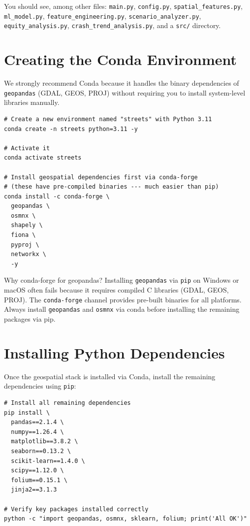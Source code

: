 \documentclass[11pt,a4paper,openany]{book}
\begin{document}
You should see, among other files: \texttt{main.py}, \texttt{config.py}, \texttt{spatial\_features.py}, \texttt{ml\_model.py}, \texttt{feature\_engineering.py}, \texttt{scenario\_analyzer.py}, \texttt{equity\_analysis.py}, \texttt{crash\_trend\_analysis.py}, and a \texttt{src/} directory.

\section{Creating the Conda Environment}

We strongly recommend Conda because it handles the binary dependencies of \texttt{geopandas} (GDAL, GEOS, PROJ) without requiring you to install system-level libraries manually.

\begin{lstlisting}[style=bash, caption={Create and activate the Conda environment}]
# Create a new environment named "streets" with Python 3.11
conda create -n streets python=3.11 -y

# Activate it
conda activate streets

# Install geospatial dependencies first via conda-forge
# (these have pre-compiled binaries --- much easier than pip)
conda install -c conda-forge \
  geopandas \
  osmnx \
  shapely \
  fiona \
  pyproj \
  networkx \
  -y
\end{lstlisting}

\begin{warnbox}{Why conda-forge for geopandas?}
Installing \texttt{geopandas} via \texttt{pip} on Windows or macOS often fails because it requires compiled C libraries (GDAL, GEOS, PROJ). The \texttt{conda-forge} channel provides pre-built binaries for all platforms. Always install \texttt{geopandas} and \texttt{osmnx} via conda before installing the remaining packages via pip.
\end{warnbox}

\section{Installing Python Dependencies}

Once the geospatial stack is installed via Conda, install the remaining dependencies using \texttt{pip}:

\begin{lstlisting}[style=bash, caption={Install remaining Python packages via pip}]
# Install all remaining dependencies
pip install \
  pandas==2.1.4 \
  numpy==1.26.4 \
  matplotlib==3.8.2 \
  seaborn==0.13.2 \
  scikit-learn==1.4.0 \
  scipy==1.12.0 \
  folium==0.15.1 \
  jinja2==3.1.3

# Verify key packages installed correctly
python -c "import geopandas, osmnx, sklearn, folium; print('All OK')"
\end{lstlisting}
\end{document}
